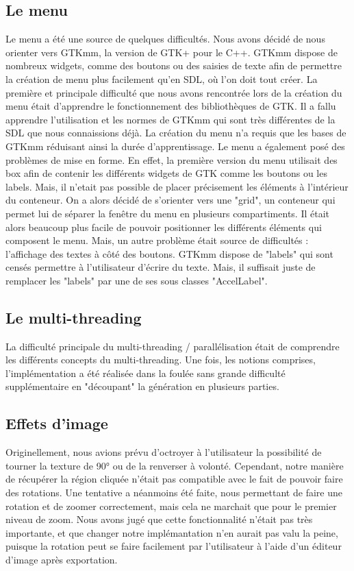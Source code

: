 \documentclass{article}
\begin{document}
	\subsection{Le menu}
	Le menu a été une source de quelques difficultés.
	Nous avons décidé de nous orienter vers GTKmm, la version de GTK+ pour le C++.
	GTKmm dispose de nombreux widgets, comme des boutons ou des saisies de texte afin de permettre la création de menu plus facilement qu'en SDL, où l'on doit tout créer.
	La première et principale difficulté que nous avons rencontrée lors de la création du menu était d'apprendre le fonctionnement des bibliothèques de GTK. Il a fallu apprendre l'utilisation et les normes de GTKmm qui sont très différentes de la SDL que nous connaissions déjà.
	La création du menu n'a requis que les bases de GTKmm réduisant ainsi la durée d'apprentissage.
	Le menu a également posé des problèmes de mise en forme.
	En effet, la première version du menu utilisait des box afin de contenir les différents widgets de GTK comme les boutons ou les labels.
	Mais, il n'etait pas possible de placer précisement les éléments à l'intérieur du conteneur.
	On a alors décidé de s'orienter vers une "grid", un conteneur qui permet lui de séparer la fenêtre du menu en plusieurs compartiments.
	Il était alors beaucoup plus facile de pouvoir positionner les différents éléments qui composent le menu.
	Mais, un autre problème était source de difficultés : l'affichage des textes à côté des boutons.
	GTKmm dispose de "labels" qui sont censés permettre à l'utilisateur d'écrire du texte.
	Mais, il suffisait juste de remplacer les "labels" par une de ses sous classes "AccelLabel".

	\subsection{Le multi-threading}
	La difficulté principale du multi-threading / parallélisation était de comprendre les différents concepts du multi-threading.
	Une fois, les notions comprises, l'implémentation a été réalisée dans la foulée sans grande difficulté supplémentaire en "découpant" la génération en plusieurs parties.

	\subsection{Effets d'image}

	Originellement, nous avions prévu d'octroyer à l'utilisateur la possibilité de tourner la texture de 90° ou de la renverser à volonté.
	Cependant, notre manière de récupérer la région cliquée n'était pas compatible avec le fait de pouvoir faire des rotations.
	Une tentative a néanmoins été faite, nous permettant de faire une rotation et de zoomer correctement, mais cela ne marchait que pour le premier niveau de zoom.
	Nous avons jugé que cette fonctionnalité n'était pas très importante, et que changer notre implémantation n'en aurait pas valu la peine, puisque la rotation peut se faire facilement par l'utilisateur à l'aide d'un éditeur d'image après exportation.
\end{document}
